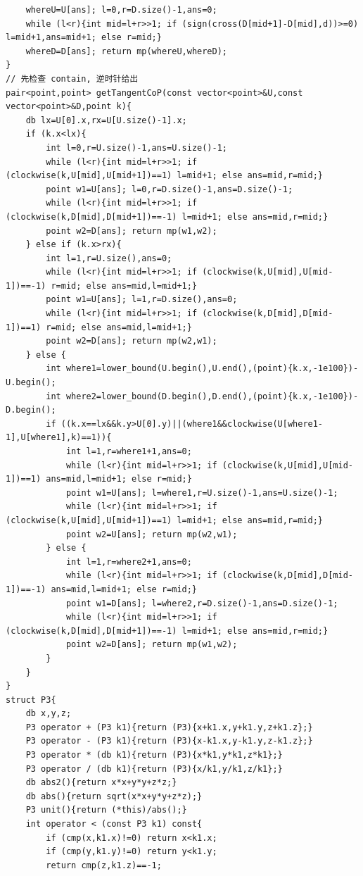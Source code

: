 \documentclass[twoside]{article}
\begin{document}
\begin{lstlisting}
    whereU=U[ans]; l=0,r=D.size()-1,ans=0;
    while (l<r){int mid=l+r>>1; if (sign(cross(D[mid+1]-D[mid],d))>=0) l=mid+1,ans=mid+1; else r=mid;}
    whereD=D[ans]; return mp(whereU,whereD);
}
// 先检查 contain, 逆时针给出
pair<point,point> getTangentCoP(const vector<point>&U,const vector<point>&D,point k){
    db lx=U[0].x,rx=U[U.size()-1].x;
    if (k.x<lx){
        int l=0,r=U.size()-1,ans=U.size()-1;
        while (l<r){int mid=l+r>>1; if (clockwise(k,U[mid],U[mid+1])==1) l=mid+1; else ans=mid,r=mid;}
        point w1=U[ans]; l=0,r=D.size()-1,ans=D.size()-1;
        while (l<r){int mid=l+r>>1; if (clockwise(k,D[mid],D[mid+1])==-1) l=mid+1; else ans=mid,r=mid;}
        point w2=D[ans]; return mp(w1,w2);
    } else if (k.x>rx){
        int l=1,r=U.size(),ans=0;
        while (l<r){int mid=l+r>>1; if (clockwise(k,U[mid],U[mid-1])==-1) r=mid; else ans=mid,l=mid+1;}
        point w1=U[ans]; l=1,r=D.size(),ans=0;
        while (l<r){int mid=l+r>>1; if (clockwise(k,D[mid],D[mid-1])==1) r=mid; else ans=mid,l=mid+1;}
        point w2=D[ans]; return mp(w2,w1);
    } else {
        int where1=lower_bound(U.begin(),U.end(),(point){k.x,-1e100})-U.begin();
        int where2=lower_bound(D.begin(),D.end(),(point){k.x,-1e100})-D.begin();
        if ((k.x==lx&&k.y>U[0].y)||(where1&&clockwise(U[where1-1],U[where1],k)==1)){
            int l=1,r=where1+1,ans=0;
            while (l<r){int mid=l+r>>1; if (clockwise(k,U[mid],U[mid-1])==1) ans=mid,l=mid+1; else r=mid;}
            point w1=U[ans]; l=where1,r=U.size()-1,ans=U.size()-1;
            while (l<r){int mid=l+r>>1; if (clockwise(k,U[mid],U[mid+1])==1) l=mid+1; else ans=mid,r=mid;}
            point w2=U[ans]; return mp(w2,w1);
        } else {
            int l=1,r=where2+1,ans=0;
            while (l<r){int mid=l+r>>1; if (clockwise(k,D[mid],D[mid-1])==-1) ans=mid,l=mid+1; else r=mid;}
            point w1=D[ans]; l=where2,r=D.size()-1,ans=D.size()-1;
            while (l<r){int mid=l+r>>1; if (clockwise(k,D[mid],D[mid+1])==-1) l=mid+1; else ans=mid,r=mid;}
            point w2=D[ans]; return mp(w1,w2);
        }
    }
}
struct P3{
    db x,y,z;
    P3 operator + (P3 k1){return (P3){x+k1.x,y+k1.y,z+k1.z};}
    P3 operator - (P3 k1){return (P3){x-k1.x,y-k1.y,z-k1.z};}
    P3 operator * (db k1){return (P3){x*k1,y*k1,z*k1};}
    P3 operator / (db k1){return (P3){x/k1,y/k1,z/k1};}
    db abs2(){return x*x+y*y+z*z;}
    db abs(){return sqrt(x*x+y*y+z*z);}
    P3 unit(){return (*this)/abs();}
    int operator < (const P3 k1) const{
        if (cmp(x,k1.x)!=0) return x<k1.x;
        if (cmp(y,k1.y)!=0) return y<k1.y;
        return cmp(z,k1.z)==-1;

\end{lstlisting}
\end{document}
